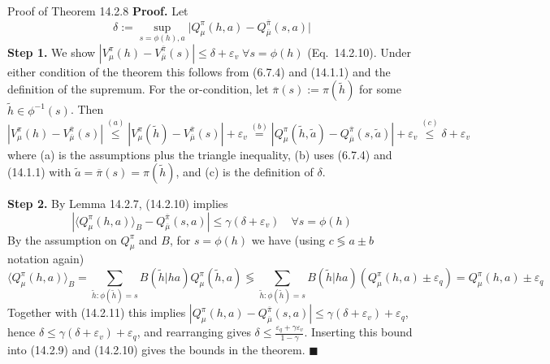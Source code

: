 \documentclass[aspectratio=169,10pt]{beamer}
\begin{document}
\begin{frame}[allowframebreaks]{Proof of Theorem 14.2.8}
  \textbf{Proof.} Let
  \[
    \delta := \sup_{s=\phi(h),a}\big|Q_\mu^\pi(h,a)-Q_{\overline\mu}^{\overline\pi}(s,a)\big| \tag{14.2.9}
  \]
  \textbf{Step 1.} We show $|V_\mu^\pi(h)-V_{\overline\mu}^{\overline\pi}(s)|\le\delta+\varepsilon_v\;\forall s=\phi(h)$
  (Eq.\ 14.2.10). Under either condition of the theorem this follows from
  (6.7.4) and (14.1.1) and the definition of the supremum. For the
  or-condition, let $\overline\pi(s):=\pi(\tilde h)$ for some
  $\tilde h\in\phi^{-1}(s)$. Then
  \[
    |V_\mu^\pi(h)-V_{\overline\mu}^{\overline\pi}(s)|
    \overset{(a)}{\le} |V_\mu^\pi(\tilde h)-V_{\overline\mu}^{\overline\pi}(s)|+\varepsilon_v
    \overset{(b)}{=} |Q_\mu^\pi(\tilde h,\tilde a)-Q_{\overline\mu}^{\overline\pi}(s,\tilde a)|+\varepsilon_v
    \overset{(c)}{\le} \delta+\varepsilon_v
  \]
  where (a) is the assumptions plus the triangle inequality, (b) uses
  (6.7.4) and (14.1.1) with $\tilde a=\overline\pi(s)=\pi(\tilde h)$, and
  (c) is the definition of $\delta$.

  \framebreak

  \textbf{Step 2.} By Lemma 14.2.7, (14.2.10) implies
  \[
    |\langle Q_\mu^\pi(h,a)\rangle_B - Q_{\overline\mu}^{\overline\pi}(s,a)| \le \gamma(\delta+\varepsilon_v) \quad\forall s=\phi(h) \tag{14.2.11}
  \]
  By the assumption on $Q^\pi_\mu$ and $B$, for $s=\phi(h)$ we have (using
  $c\lessgtr a\pm b$ notation again)
  \[
    \langle Q_\mu^\pi(h,a)\rangle_B = \sum_{\tilde h:\phi(\tilde h)=s} B(\tilde h|ha)Q_\mu^\pi(\tilde h,a)
    \lessgtr \sum_{\tilde h:\phi(\tilde h)=s} B(\tilde h|ha)(Q_\mu^\pi(h,a)\pm\varepsilon_q)
    = Q_\mu^\pi(h,a)\pm\varepsilon_q
  \]
  Together with (14.2.11) this implies
  $|Q_\mu^\pi(h,a)-Q_{\overline\mu}^{\overline\pi}(s,a)|\le\gamma(\delta+\varepsilon_v)+\varepsilon_q$,
  hence $\delta\le\gamma(\delta+\varepsilon_v)+\varepsilon_q$, and
  rearranging gives $\delta\le\frac{\varepsilon_q+\gamma\varepsilon_v}{1-\gamma}$.
  Inserting this bound into (14.2.9) and (14.2.10) gives the bounds in the
  theorem. $\blacksquare$
\end{frame}
\end{document}
